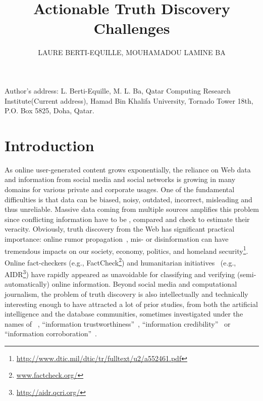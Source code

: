 \documentclass[prodmode,acmtecs]{acmsmall} %
\begin{document}
\title{Actionable Truth Discovery Challenges}
\author{LAURE BERTI-EQUILLE, MOUHAMADOU LAMINE BA
}



\begin{bottomstuff}
Author's address: L. Berti-Equille, M. L. Ba, Qatar Computing Research Institute(Current address), Hamad
Bin Khalifa University, Tornado Tower 18th, P.O. Box 5825, Doha, Qatar.
\end{bottomstuff}

\maketitle


\section{Introduction}
As online user-generated content grows exponentially, the reliance on Web data and information from social 
media and social networks is growing in many domains for various private and corporate usages. 
One of the fundamental difficulties is that data can be biased, noisy, outdated, incorrect, misleading and
thus unreliable. Massive data coming from multiple sources amplifies this problem since conflicting information
have to be , compared  and check to estimate their veracity. Obviously, truth discovery from 
the Web has significant practical importance: online rumor propagation~\cite{rumor-icdm2013}, mis- or disinformation
can have tremendous impacts on our society, economy, politics, and homeland security\footnote{\scriptsize{\url{http://www.dtic.mil/dtic/tr/fulltext/u2/a552461.pdf}}}. 
Online fact-checkers (e.g., FactCheck\footnote{\scriptsize{\url{www.factcheck.org/}}}) and humanitarian initiatives~\cite{ImranECDM13}
(e.g., AIDR\footnote{\scriptsize{\url{http://aidr.qcri.org/}}}) have rapidly appeared as unavoidable for classifying and verifying 
(semi-automatically) online information.
Beyond social media and computational journalism, the problem of truth discovery is also intellectually and technically interesting enough to have attracted a lot of prior studies, from both the artificial 
intelligence and the database communities, sometimes investigated under the names of  ~\cite{GoasdoueKKLMZ13}, ``information trustworthiness''~\cite{Thirunarayan2014182}, ``information credibility''~\cite{PasternackR13} or ``information corroboration''~\cite{GallandAMS10}. 
\end{document}
